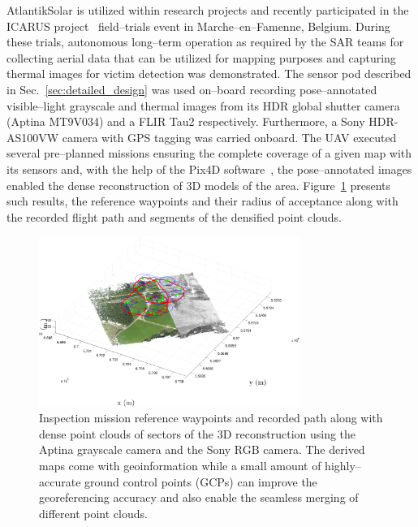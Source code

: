 AtlantikSolar is utilized within research projects and recently participated in the ICARUS project~\cite{ICARUSsite} field--trials event in Marche--en--Famenne, Belgium. During these trials, autonomous long--term operation as required by the SAR teams for collecting aerial data that can be utilized for mapping purposes and capturing thermal images for victim detection was demonstrated. The sensor pod described in Sec.~\ref{sec:detailed_design} was used on--board recording pose--annotated visible--light grayscale and thermal images from its HDR global shutter camera (Aptina MT9V034) and a FLIR Tau2 respectively. Furthermore, a Sony HDR-AS100VW camera with GPS tagging was carried onboard. The UAV executed several pre--planned missions ensuring the complete coverage of a given map with its sensors and, with the help of the Pix4D software~\cite{Pix4Dsite}, the pose--annotated images enabled the dense reconstruction of $3\textrm{D}$ models of the area. Figure~\ref{fig:mef_icarus_reconstruction} presents such results, the reference waypoints and their radius of acceptance along with the recorded flight path and segments of the densified point clouds. 


%
\begin{figure}[htbp]
\begin{center}
  \includegraphics*[width=8.5cm]{images/MeF_GS_RGB_Merged_v4.eps} %
\end{center}
\caption{Inspection mission reference waypoints and recorded path along with dense point clouds of sectors of the $3\textrm{D}$ reconstruction using the Aptina grayscale camera and the Sony RGB camera. The derived maps come with geoinformation while a small amount of highly--accurate ground control points (GCPs) can improve the georeferencing accuracy and also enable the seamless merging of different point clouds.  }
\label{fig:mef_icarus_reconstruction}
\end{figure}
%

